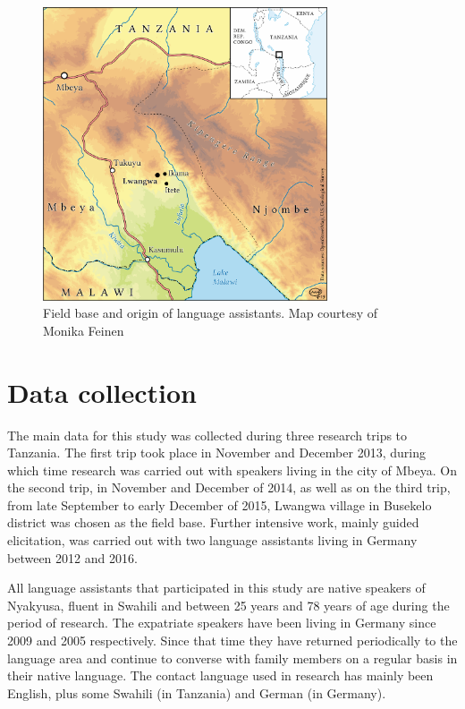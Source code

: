 \begin{figure}[hbt]
\begin{center}
\includegraphics[width=0.75\textwidth]{figures/MapLwangwaIkamaItete.png}
\caption{Field base and origin of language assistants. Map courtesy of Monika Feinen}
\label{MapLwangwaIkamaItete}
\end{center}
\end{figure}

\label{Varietydescribed}
\section{Data collection}\label{DataCollection}
The main data for this study was collected during three research trips to Tanzania. The first trip took place in November and December 2013, during which time research was carried out with speakers living in the city of Mbeya. On the second trip, in November and December of 2014, as well as on the third trip, from late September to early December of 2015, Lwangwa village in Busekelo district was chosen as the field base. Further intensive work, mainly guided elicitation, was carried out with two language assistants living in Germany between 2012 and 2016.

All language assistants that participated in this study are native speakers of Nyakyusa, fluent in Swahili and between 25 years and 78 years of age during the period of research. The expatriate speakers have been living in Germany since 2009 and 2005 respectively. Since that time they have returned periodically to the language area and continue to converse with family members on a regular basis in their native language. The contact language used in research has mainly been English, plus some Swahili (in Tanzania) and German (in Germany). 

